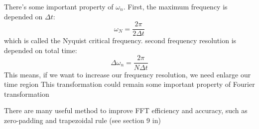 \documentclass[12pt,a4paper,scale=1.0]{article}
\begin{document}
 	There's some important property of ${\omega_n}$. First, the maximum frequency is depended on $\Delta t$:
 	\begin{equation}\label{equ:4-3}
 	\omega_N= \frac{2\pi}{2\Delta t}
 	\end{equation}
 	which is called the Nyquist critical frequency. second frequency resolution is depended on total time:
 	\begin{equation}\label{equ:4-4}
 	\Delta \omega_n = \frac{2\pi}{N\Delta t}
 	\end{equation}
 	This means, if we want to increase our frequency resolution, we need enlarge our time region
 	This transformation could remain some important property of Fourier transformation
 	
 	There are many useful method to improve FFT efficiency and accuracy, such as zero-padding and trapezoidal rule (see section 9 in\cite{hamm_zanni_2011})
	
	
	
\end{document}
